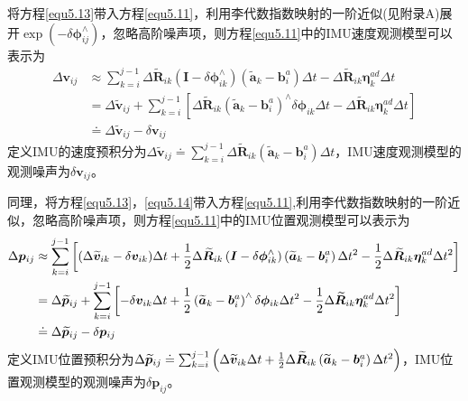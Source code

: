 将方程\eqref{equ5.13}带入方程\eqref{equ5.11}，利用李代数指数映射的一阶近似(见附录A)展开$\exp \left(  -\delta \boldsymbol{\phi}_{ij}^{\wedge}  \right)$，忽略高阶噪声项，则方程\eqref{equ5.11}中的IMU速度观测模型可以表示为
\begin{equation}
\label{equ5.14}
\begin{aligned}
\Delta \boldsymbol{v}_{ij} & \approx \sum\limits_{k=i}^{j-1} \Delta \widetilde{\boldsymbol{R}}_{ik}\left( \boldsymbol{I}-\delta \boldsymbol{\phi}_{ik}^{\wedge} \right) \left( \widetilde{\boldsymbol{a}}_k - \boldsymbol{b}_i^a \right) \Delta t -\Delta \widetilde{\boldsymbol{R}}_{ik} \boldsymbol{\eta}_k^{ad} \Delta t 
\\ 
& = \Delta \widetilde{\boldsymbol{v}}_{ij} + \sum\limits_{k=i}^{j-1} \left[ \Delta \widetilde{\boldsymbol{R}}_{ik} \left( \widetilde{\boldsymbol{a}}_k - \boldsymbol{b}_i^a \right)^{\wedge} \delta \boldsymbol{\phi}_{ik} \Delta t - \Delta \widetilde{\boldsymbol{R}}_{ik} \boldsymbol{\eta}_k^{ad} \Delta t \right] \\ 
& \doteq  \Delta \widetilde{\boldsymbol{v}}_{ij} - \delta \boldsymbol{v}_{ij}
\end{aligned}
\end{equation}
定义IMU的速度预积分为$\Delta \widetilde{\boldsymbol{v}}_{ij} \doteq \sum_{k=i}^{j-1} \Delta \widetilde{\boldsymbol{R}}_{ik} \left( \widetilde{\boldsymbol{a}}_k - \boldsymbol{b}_i^a \right) \Delta t $，IMU速度观测模型的观测噪声为$\delta \boldsymbol{v}_{ij}$。

同理，将方程\eqref{equ5.13}，\eqref{equ5.14}带入方程\eqref{equ5.11},利用李代数指数映射的一阶近似，忽略高阶噪声项，则方程\eqref{equ5.11}中的IMU位置观测模型可以表示为
\begin{equation}
\label{equ5.15}
\begin{aligned} 
\Delta \boldsymbol{p}_{ij} & \approx \sum\limits_{k=i}^{j-1} \left[ (\Delta \widetilde{\boldsymbol{v}}_{ik} - \delta \boldsymbol{v}_{ik}) \Delta t + {1 \over 2} \Delta \widetilde{\boldsymbol{R}}_{ik}\left( \boldsymbol{I}-\delta \boldsymbol{\phi}_{ik}^{\wedge} \right) \left( \widetilde{\boldsymbol{a}}_k - \boldsymbol{b}_i^a  \right) \Delta t^2 - {1 \over 2} \Delta \widetilde{\boldsymbol{R}}_{ik} \boldsymbol{\eta}_k^{ad} \Delta t^2 \right] 
\\ 
& =  \Delta \widetilde{\boldsymbol{p}}_{ij} + \sum\limits_{k=i}^{j-1} \left[ -\delta \boldsymbol{v}_{ik} \Delta t + {1 \over 2} \left( \widetilde{\boldsymbol{a}}_k - \boldsymbol{b}_i^a  \right) ^{\wedge} \delta \boldsymbol{\phi}_{ik} \Delta t^2 - {1 \over 2} \Delta \widetilde{\boldsymbol{R}}_{ik} \boldsymbol{\eta}_k^{ad} \Delta t^2 \right] \\ 
& \doteq \Delta \widetilde{\boldsymbol{p}}_{ij} - \delta \boldsymbol{p}_{ij}
\end{aligned}
\end{equation}
定义IMU位置预积分为$\Delta \widetilde{\boldsymbol{p}}_{ij} \doteq \sum_{k=i}^{j-1} \left( \Delta \widetilde{\boldsymbol{v}}_{ik} \Delta t +  {1 \over 2} \Delta \widetilde{\boldsymbol{R}}_{ik} \left( \widetilde{\boldsymbol{a}}_k - \boldsymbol{b}_i^a  \right) \Delta t^2 \right)$，IMU位置观测模型的观测噪声为$\delta \boldsymbol{p}_{ij}$。

